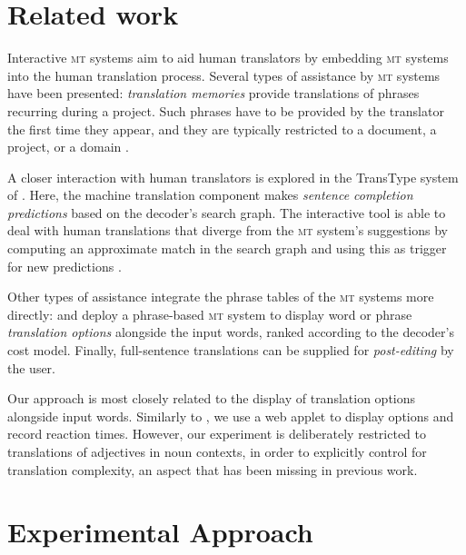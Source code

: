 \documentclass[output=paper]{LSP/langsci}
\begin{document}
\section{Related work}
\label{sec:kremer:relatedwork}
Interactive \textsc{mt} systems aim to aid human translators by
embedding \textsc{mt} systems into the human translation
process. Several types of assistance by \textsc{mt} systems have been
presented: \emph{translation memories} \citep{Bowker:02} provide
translations of phrases recurring during a project. Such phrases have
to be provided by the translator the first time they appear, and they
are typically restricted to a document, a project, or a domain
\cite{Zanettin:02, Freigang:98}.

A closer interaction with human translators is explored in the
TransType system of \cite{LanglaisETAL:00}. Here, the machine
translation component makes \emph{sentence completion predictions}
based on the decoder's search graph. The interactive tool is able to
deal with human translations that diverge from the \textsc{mt} system's
suggestions by computing an approximate match in the search graph and
using this as trigger for new predictions \citep{BarrachinaETAL:08}.

Other types of assistance integrate the phrase tables of the
\textsc{mt} systems more directly: \cite{KoehnHaddow:09} and
\cite{Koehn:10} deploy a phrase-based \textsc{mt} system to display
word or phrase \emph{translation options} alongside the input words,
ranked according to the decoder's cost model. Finally, full-sentence
translations can be supplied for \emph{post-editing} by the user.

Our approach is most closely related to the display of translation
options alongside input words. Similarly to \cite{KoehnHaddow:09}, we
use a web applet to display options and record reaction
times. However, our experiment is deliberately restricted to
translations of adjectives in noun contexts, in order to explicitly
control for translation complexity, an aspect that has been missing in
previous work.


\section{Experimental Approach}
\label{sec:kremer:exp-appr}



\end{document}

